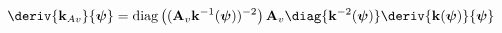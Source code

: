 \begin{equation}
\label{eq:mass-matrix-kav-deriv}
\deriv{\mathbf{k}_{Av}}{\boldsymbol{\psi}}
=
{\rm diag}\left(
    (\mathbf{A}_v \mathbf{k}^{-1}(\boldsymbol{\psi}))^{-2} \right)
\mathbf{A}_v
\diag{
    \mathbf{k}^{-2}(\boldsymbol{\psi}) }
\deriv{\mathbf{k}(\boldsymbol{\psi})}{\boldsymbol{\psi}}
\end{equation}
